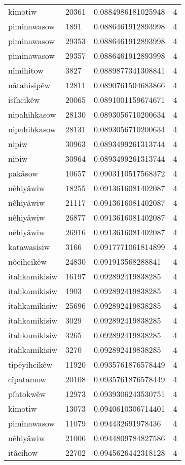 \begin{longtable}{llll}
kimotiw & 20361 & 0.0884986181025948 & 4 \\
piminawasow & 1891 & 0.0886461912893998 & 4 \\
piminawasow & 29353 & 0.0886461912893998 & 4 \\
piminawasow & 29357 & 0.0886461912893998 & 4 \\
nîmihitow & 3827 & 0.0889877341308841 & 4 \\
nâtahisipêw & 12811 & 0.0890761504683866 & 4 \\
isîhcikêw & 20065 & 0.0891001159674671 & 4 \\
nipahihkasow & 28130 & 0.0893056710200634 & 4 \\
nipahihkasow & 28131 & 0.0893056710200634 & 4 \\
nipiw & 30963 & 0.0893499261313744 & 4 \\
nipiw & 30964 & 0.0893499261313744 & 4 \\
pakâsow & 10657 & 0.0903110517568372 & 4 \\
nêhiyâwiw & 18255 & 0.0913616081402087 & 4 \\
nêhiyâwiw & 21117 & 0.0913616081402087 & 4 \\
nêhiyâwiw & 26877 & 0.0913616081402087 & 4 \\
nêhiyâwiw & 26916 & 0.0913616081402087 & 4 \\
katawasisiw & 3166 & 0.0917771061814899 & 4 \\
nôcihcikêw & 24830 & 0.091913568288841 & 4 \\
itahkamikisiw & 16197 & 0.092892419838285 & 4 \\
itahkamikisiw & 1903 & 0.092892419838285 & 4 \\
itahkamikisiw & 25696 & 0.092892419838285 & 4 \\
itahkamikisiw & 3029 & 0.092892419838285 & 4 \\
itahkamikisiw & 3265 & 0.092892419838285 & 4 \\
itahkamikisiw & 3270 & 0.092892419838285 & 4 \\
tipêyihcikêw & 11920 & 0.0935761876578449 & 4 \\
cîpatamow & 20108 & 0.0935761876578449 & 4 \\
pîhtokwêw & 12973 & 0.0939306243530751 & 4 \\
kimotiw & 13073 & 0.0940610306714401 & 4 \\
piminawasow & 11079 & 0.094432691978436 & 4 \\
nêhiyâwiw & 21006 & 0.0944809784827586 & 4 \\
itâcihow & 22702 & 0.0945626442318128 & 4 \\

\end{longtable}
